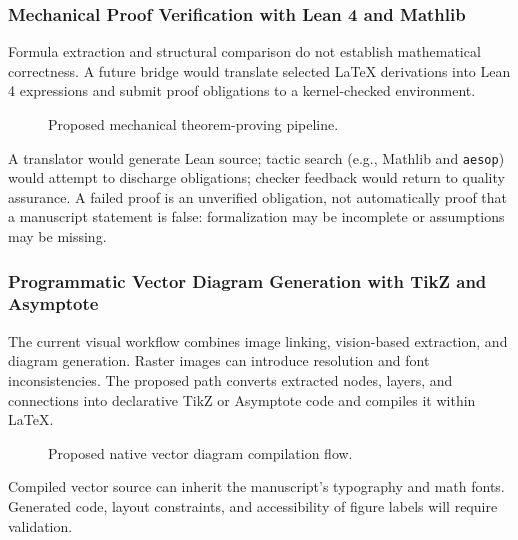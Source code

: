 \documentclass[conference]{IEEEtran}
\begin{document}
\subsubsection{Mechanical Proof Verification with Lean 4 and Mathlib}
Formula extraction and structural comparison do not establish mathematical correctness. A future bridge would translate selected LaTeX derivations into Lean 4 expressions and submit proof obligations to a kernel-checked environment.
\begin{figure}[t]\centering{}\caption{Proposed mechanical theorem-proving pipeline.}\label{fig:lean-pipeline}\end{figure}
A translator would generate Lean source; tactic search (e.g., Mathlib and \texttt{aesop}) would attempt to discharge obligations; checker feedback would return to quality assurance. A failed proof is an unverified obligation, not automatically proof that a manuscript statement is false: formalization may be incomplete or assumptions may be missing.
\subsubsection{Programmatic Vector Diagram Generation with TikZ and Asymptote}
The current visual workflow combines image linking, vision-based extraction, and diagram generation. Raster images can introduce resolution and font inconsistencies. The proposed path converts extracted nodes, layers, and connections into declarative TikZ or Asymptote code and compiles it within LaTeX.
\begin{figure}[t]\centering{}\caption{Proposed native vector diagram compilation flow.}\label{fig:vector-flow}\end{figure}
Compiled vector source can inherit the manuscript's typography and math fonts. Generated code, layout constraints, and accessibility of figure labels will require validation.
\end{document}
